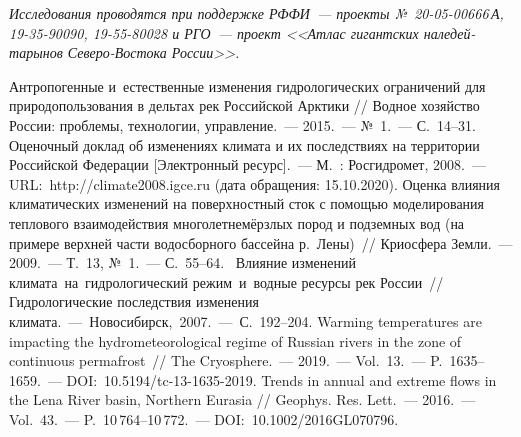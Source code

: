 \textit{Исследования проводятся при поддержке РФФИ~--- проекты №~20-05-00666\,А, 19-35-90090, 19-55-80028 и РГО~--- проект <<Атлас гигантских наледей-тарынов Северо-Востока России>>.}

\begin{thebibliography}{99}
\bibitem{} Антропогенные и~естественные изменения гидрологических ограничений для природопользования в дельтах рек Российской Арктики // Водное хозяйство России: проблемы, технологии, управление.~--- 2015.~--- №~1.~--- С.~14--31.
\bibitem{}Оценочный доклад об изменениях климата и их последствиях на территории Российской Федерации [Электронный ресурс].~--- М.~: Росгидромет, 2008.~--- URL:~http://climate2008.igce.ru (дата обращения: 15.10.2020).
\bibitem{} Оценка влияния климатических изменений на поверхностный сток с помощью моделирования теплового взаимодействия многолетне\-мёрзлых пород и подземных вод (на примере верхней части водосборного бассейна р.~Лены)~// Криосфера Земли.~--- 2009.~--- Т.~13, №~1.~--- С.~55--64.
\bibitem{} Влияние изменений климата на гидрологический режим и водные ресурсы рек России~// Гидрологические последствия изменения климата.~--- Новосибирск, 2007.~--- С.~192--204.
\bibitem{} Warming temperatures are impacting the hydrometeorological regime of Russian rivers in the zone of continuous permafrost~// The Cryosphere.~--- 2019.~--- Vol.~13.~--- P.~1635--1659.~--- DOI:~10.5194/tc-13-1635-2019.
\bibitem{} Trends in annual and extreme flows in the Lena River basin, Northern Eurasia // Geophys. Res. Lett.~--- 2016.~--- Vol.~43.~--- P.~10\,764--10\,772.~--- DOI:~10.1002/2016GL070796.

\end{thebibliography}
